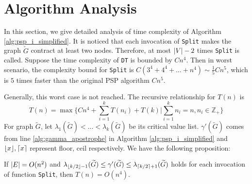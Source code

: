 \documentclass[runningheads]{llncs}
\begin{document}
\section{Algorithm Analysis}
In this section, we give detailed analysis of time complexity of Algorithm \ref{alg:psp_i_simplified}.
It is noticed that each invocation of \texttt{Split} makes the graph $\widetilde{G}$ contract at least two nodes. Therefore, at most $\lvert V\rvert-2$ times \texttt{Split} is called. Suppose the time complexity of \texttt{DT} is bounded by $Cn^4$. Then in worst scenario, the complexity bound for \texttt{Split} is $C(3^4+4^4 + \dots + n^4) \sim \frac{1}{5}Cn^5$, which is $5$ times faster than the original PSP algorithm $Cn^5$.

Generally, this worst case is not reached. The recursive relationship for $T(n)$ is
\begin{equation}\label{eq:Tn}
T(n) = \max \{ C n^4 + \sum_{i=1}^k T(n_i) + T(k) | \sum_{i=1}^k n_i = n, n_i \in \mathbb{Z}_{+} \}
\end{equation}	
For graph $\widetilde{G}$, let $\lambda_1(\widetilde{G}) < \dots < \lambda_k(\widetilde{G})$ be its critical value list. $\gamma'(\widetilde{G})$ comes from line \ref{alg:gamma_apostrophe} in Algorithm \ref{alg:psp_i_simplified} and $\lfloor x\rfloor, \lceil x\rceil$ represent floor, ceil respectively.
We have the following proposition:
\begin{proposition}\label{prop:alg_complexity}
	If $\lvert E\rvert = O(n^2)$ and $ \lambda_{\lfloor k/2\rfloor - 1}(\widetilde{G}) \leq \gamma'(\widetilde{G}) \leq \lambda_{\lceil k/2\rceil + 1}(\widetilde{G}) $ holds for each invocation of function \texttt{Split}, then $T(n) = O(n^4)$.
\end{proposition}
\end{document}
